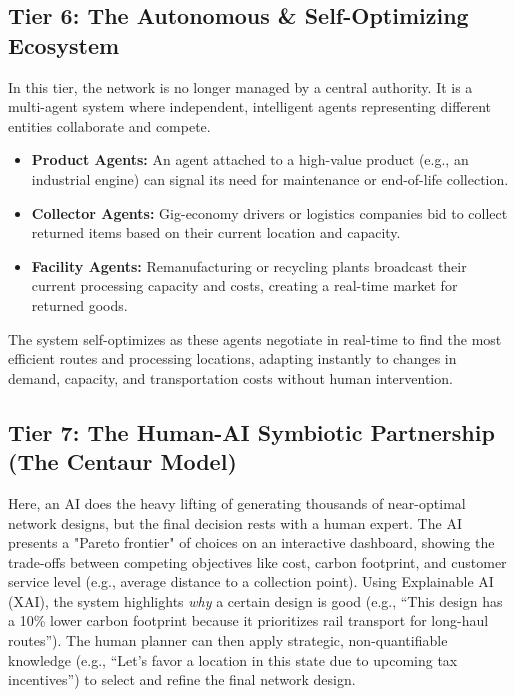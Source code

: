 \documentclass{article}
\begin{document}
\subsection{Tier 6: The Autonomous \& Self-Optimizing Ecosystem}
In this tier, the network is no longer managed by a central authority. It is a multi-agent system where independent, intelligent agents representing different entities collaborate and compete.
\begin{itemize}
    \item \textbf{Product Agents:} An agent attached to a high-value product (e.g., an industrial engine) can signal its need for maintenance or end-of-life collection.
    \item \textbf{Collector Agents:} Gig-economy drivers or logistics companies bid to collect returned items based on their current location and capacity.
    \item \textbf{Facility Agents:} Remanufacturing or recycling plants broadcast their current processing capacity and costs, creating a real-time market for returned goods.
\end{itemize}
The system self-optimizes as these agents negotiate in real-time to find the most efficient routes and processing locations, adapting instantly to changes in demand, capacity, and transportation costs without human intervention.

\subsection{Tier 7: The Human-AI Symbiotic Partnership (The Centaur Model)}
Here, an AI does the heavy lifting of generating thousands of near-optimal network designs, but the final decision rests with a human expert. The AI presents a "Pareto frontier" of choices on an interactive dashboard, showing the trade-offs between competing objectives like cost, carbon footprint, and customer service level (e.g., average distance to a collection point). Using Explainable AI (XAI), the system highlights \textit{why} a certain design is good (e.g., ``This design has a 10\% lower carbon footprint because it prioritizes rail transport for long-haul routes''). The human planner can then apply strategic, non-quantifiable knowledge (e.g., ``Let's favor a location in this state due to upcoming tax incentives'') to select and refine the final network design.
\end{document}
